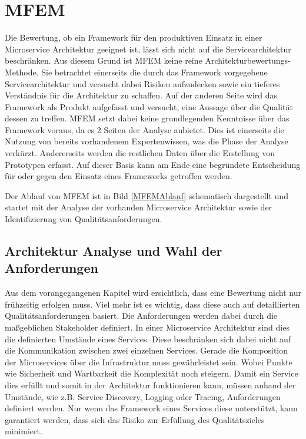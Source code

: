 \section{\acf{MFEM}}

Die Bewertung, ob ein Framework für den produktiven Einsatz in einer Microservice Architektur geeignet ist, lässt sich nicht auf die Servicearchitektur beschränken. Aus diesem Grund ist \ac{MFEM} keine reine Architekturbewertungs-Methode. Sie betrachtet einerseits die durch das Framework vorgegebene Servicearchitektur und versucht dabei Risiken aufzudecken sowie ein tieferes Verständnis für die Architektur zu schaffen. Auf der anderen Seite wird das Framework als Produkt aufgefasst und versucht, eine Aussage über die Qualität dessen zu treffen. \ac{MFEM} setzt dabei keine grundlegenden Kenntnisse über das Framework voraus, da es 2 Seiten der Analyse anbietet. Dies ist einerseits die Nutzung von bereits vorhandenem Expertenwissen, was die Phase der Analyse verkürzt. Andererseits werden die restlichen Daten über die Erstellung von Prototypen erfasst.
Auf dieser Basis kann am Ende eine begründete Entscheidung für oder gegen den Einsatz eines Frameworks getroffen werden.

Der Ablauf von \ac{MFEM} ist in Bild \ref{MFEMAblauf} schematisch dargestellt und startet mit der Analyse der vorhanden Microservice Architektur sowie der Identifizierung von Qualitätsanforderungen.


\subsection{Architektur Analyse und Wahl der Anforderungen}

Aus dem vorangegangenen Kapitel wird ersichtlich, dass eine Bewertung nicht nur frühzeitig erfolgen muss. Viel mehr ist es wichtig, dass diese auch auf detaillierten Qualitätsanforderungen basiert. Die Anforderungen werden dabei durch die maßgeblichen Stakeholder definiert. In einer Microservice Architektur sind dies die definierten Umstände eines Services. Diese beschränken sich dabei nicht auf die Kommunikation zwischen zwei einzelnen Services. Gerade die Komposition der Microservices über die Infrastruktur muss gewährleistet sein. Wobei Punkte wie Sicherheit und Wartbarkeit die Komplexität noch steigern.
Damit ein Service dies erfüllt und somit in der Architektur funktionieren kann, müssen anhand der Umstände, wie z.B. Service Discovery, Logging oder Tracing, Anforderungen definiert werden. Nur wenn das Framework eines Services diese unterstützt, kann garantiert werden, dass sich das Risiko zur Erfüllung des Qualitätszieles minimiert.

